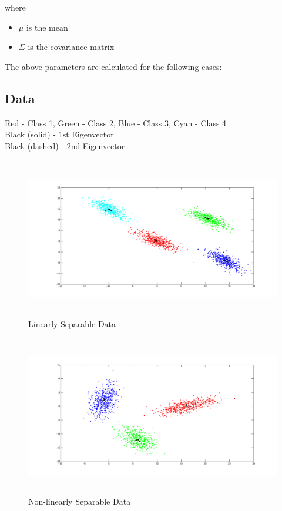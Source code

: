 \documentclass[11pt,a4paper]{article}
\begin{document}
 where
 \begin{itemize}
 	\item $\mu$ is the mean 
 	\item $\Sigma$ is the covariance matrix
 \end{itemize}
 
 The above parameters are calculated for the following cases:
\subsection{Data}
Red - Class 1, Green - Class 2, Blue - Class 3, Cyan - Class 4\\
Black (solid) - 1st Eigenvector\\
Black (dashed) - 2nd Eigenvector\\  
\begin{figure}[H]
		\centering
\includegraphics[height=7cm]{Figures/ls_eig.png}
\caption{Linearly Separable Data}
\end{figure}

\begin{figure}[H]
		\centering
\includegraphics[height=7cm]{Figures/NLS_eig.png}
\caption{Non-linearly Separable Data}
\end{figure}
\end{document}
